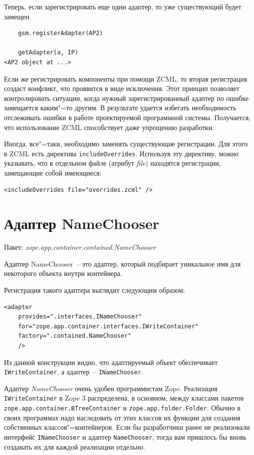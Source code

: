 \documentclass[a4paper,openany,twoside,final]{book}
\providecommand*{\DUroletitlereference}[1]{\textsl{#1}}
\begin{document}
Теперь, если зарегистрировать еще один адаптер, то уже существующий будет замещен.

\begin{verbatim}
    gsm.registerAdapter(AP2)

    getAdapter(a, IP)
<AP2 object at ...>
\end{verbatim}

Если же регистрировать компоненты при помощи ZCML, то вторая регистрация создаст конфликт, что проявится в виде исключения.  Этот принцип позволяет контролировать ситуации, когда нужный зарегистрированный адаптер по ошибке замещается каким"=то другим.  В результате удается избегать необходимость отслеживать ошибки в работе проектируемой программной системы.  Получается, что использование ZCML способствует даже упрощению разработки.

Иногда, все"=таки, необходимо заменять существующие регистрации.  Для этого в ZCML есть директива \texttt{includeOverrides}.  Используя эту директиву, можно указывать, что в отдельном файле (атрибут \DUroletitlereference{file}) находятся регистрации, замещающие собой имеющиеся:

\begin{verbatim}
<includeOverrides file="overrides.zcml" />
\end{verbatim}


\section{Адаптер NameChooser%
  \label{namechooser}%
}

Пакет: \DUroletitlereference{zope.app.container.contained.NameChooser}

Адаптер NameChooser~-- это адаптер, который подбирает уникальное имя для некоторого объекта внутри контейнера.

Регистрация такого адаптера выглядит следующим образом:

\begin{verbatim}
<adapter
    provides=".interfaces.INameChooser"
    for="zope.app.container.interfaces.IWriteContainer"
    factory=".contained.NameChooser"
    />
\end{verbatim}

Из данной конструкции видно, что адаптируемый объект обеспечивает \texttt{IWriteContainer}, а адаптер~-- \texttt{INameChooser}.

Адаптер \DUroletitlereference{NameChooser} очень удобен программистам Zope.  Реализация \texttt{IWriteContainer} в Zope 3 распределена, в основном, между классами пакетов \texttt{zope.app.container.BTreeContainer} и \texttt{zope.app.folder.Folder}.  Обычно в своих программах надо наследовать от этих классов их функции для создания собственных классов"=контейнеров.  Если бы разработчики ранее не реализовали интерфейс \texttt{INameChooser} и адаптер \texttt{NameChooser}, тогда вам пришлось бы вновь создавать их для каждой реализации отдельно.
\end{document}
